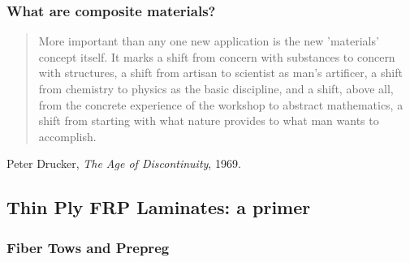 \documentclass[first,firstsupp,lastsupp,handout,last,hyperref,table]{ETHclass}
\begin{document}
\begin{frame}
\frametitle{What are composite materials?}
\centering
\begin{quote}
More important than any one new application is the new 'materials' concept itself. It marks a shift from concern with substances to concern with structures, a shift from artisan to scientist as man's artificer, a shift from chemistry to physics as the basic discipline, and a shift, above all, from the concrete experience of the workshop to abstract mathematics, a shift from starting with what nature provides to what man wants to accomplish.
\end{quote}

Peter Drucker, \textit{The Age of Discontinuity}, 1969.
\end{frame}


\subsection{Thin Ply FRP Laminates: a primer}

\begin{frame}
\frametitle{Fiber Tows and Prepreg}
\centering
\begin{figure}[!h]
\centering
{}\quad
{}
  \label{fig:composites}
\end{figure}
\end{frame}
\end{document}
